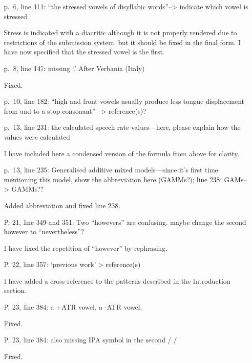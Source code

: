 \documentclass[]{article}
\begin{document}
p.~6, line 111: ``the stressed vowels of disyllabic
words''--\textgreater{} indicate which vowel is stressed

\color{plum}

Stress is indicated with a diacritic although it is not properly
rendered due to restrictions of the submission system, but it should be
fixed in the final form. I have now specified that the stressed vowel is
the first. \color{black}

p.~8, line 147: missing `.' After Verbania (Italy)

\color{plum}

Fixed. \color{black}

p.~10, line 182: ``high and front vowels usually produce less tongue
displacement from and to a stop consonant'' --\textgreater{}
reference(s)?

p.~13, line 231: the calculated speech rate values---here, please
explain how the values were calculated

\color{plum}

I have included here a condensed version of the formula from above for
clarity. \color{black}

p.~13, line 235: Generalised additive mixed models---since it's first
time mentioning this model, show the abbreviation here (GAMMs?); line
238: GAMs--\textgreater{} GAMMs??

\color{plum}

Added abbreviation and fixed line 238. \color{black}

P. 21, line 349 and 351: Two ``howevers'' are confusing. maybe change
the second however to ``nevertheless''?

\color{plum}

I have fixed the repetition of ``however'' by rephrasing. \color{black}

P. 22, line 357: `previous work' \textgreater{} reference(s)

\color{plum}

I have added a cross-reference to the patterns described in the
Introduction section. \color{black}

P. 23, line 384: a +ATR vowel, a -ATR vowel,

\color{plum}

Fixed. \color{black}

P. 23, line 384: also missing IPA symbol in the second / /

\color{plum}

Fixed. \color{black}
\end{document}
